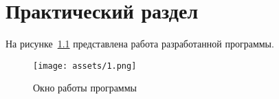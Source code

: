 \chapter{Практический раздел}

На рисунке~\ref{fig:1} представлена работа разработанной программы.

\begin{figure}[ht]
    \centering
    \texttt{[image: assets/1.png]}
    \caption{Окно работы программы}
    \label{fig:1}
\end{figure}


